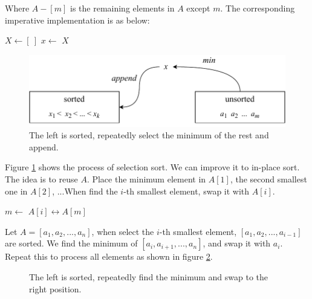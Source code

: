 \documentclass[b5paper]{article}
\begin{document}
Where $A - [m]$ is the remaining elements in $A$ except $m$. The corresponding imperative implementation is as below:

\begin{algorithmic}[1]
  \State $X \gets [\ ]$
    \State $x \gets$ 
    \State {}
    \State {}
  \EndWhile
  \State \Return $X$
\EndFunction
\end{algorithmic}

\begin{figure}[htbp]
  \centering
  \includegraphics[scale=0.8]{img/ssort}
  \caption{The left is sorted, repeatedly select the minimum of the rest and append.}
  \label{fig:sel-sort}
\end{figure}

Figure \ref{fig:sel-sort} shows the process of selection sort. We can improve it to in-place sort. The idea is to reuse $A$. Place the minimum element in $A[1]$, the second smallest one in $A[2]$, ...When find the $i$-th smallest element, swap it with $A[i]$.

\begin{algorithmic}[1]
    \State $m \gets$ 
    \State {} $A[i] \leftrightarrow A[m]$
  \EndFor
\EndFunction
\end{algorithmic}

Let $A = [a_1, a_2, ..., a_n]$, when select the $i$-th smallest element, $[a_1, a_2, ..., a_{i-1}]$ are sorted. We find the minimum of $[a_i, a_{i+1}, ..., a_n]$, and swap it with $a_i$. Repeat this to process all elements as shown in figure \ref{fig:in-place-ssort}.

\begin{figure}[htbp]
  \centering
  \caption{The left is sorted, repeatedly find the minimum and swap to the right position.}
  \label{fig:in-place-ssort}
\end{figure}
\end{document}
